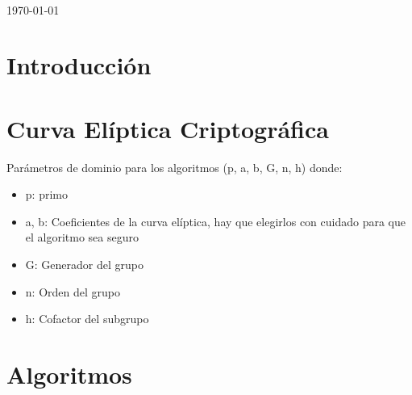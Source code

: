 \documentclass[11pt]{article}
\begin{document}
\begin{titlepage}
\centering
\vspace*{4.5cm}
\fontsize{30pt}{40pt}{\selectfont\sffamily{\textcolor{ColorTitulo}{Trabajo Teoría}}}\\
\vspace{5mm}
\fontsize{60pt}{50pt}{\selectfont\sffamily{\textcolor{ColorTitulo}{Curva Elíptica}}}
\vspace{1.5cm}

{\scshape\large \today \par}
\vspace{1cm}


\vspace*{\fill}
\vspace*{-2cm}

\end{titlepage}

\thispagestyle{empty}
\tableofcontents

\newpage

\section{Introducción}

\section{Curva Elíptica Criptográfica}



Parámetros de dominio para los algoritmos (p, a, b, G, n, h) donde:
\begin{itemize}
	\item p: primo
	\item a, b: Coeficientes de la curva elíptica, hay que elegirlos con cuidado para que el algoritmo sea seguro
	\item G: Generador del grupo
	\item n: Orden del grupo
	\item h: Cofactor del subgrupo
\end{itemize}


\section{Algoritmos}
\end{document}
